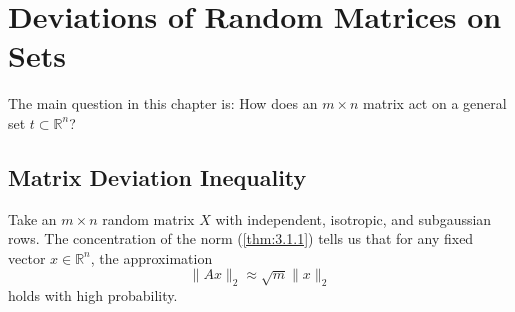 \section{Deviations of Random Matrices on Sets}
The main question in this chapter is: How does an $m \times n$ matrix act on a general set $t \subset 
\mathbb{R}^n$? 



\subsection{Matrix Deviation Inequality}
Take an $m \times n$ random matrix $X$ with independent, isotropic, and subgaussian rows. The concentration of 
the norm (\cref{thm:3.1.1}) tells us that for any fixed vector $x \in \mathbb{R}^n$, the approximation 
\[ \lVert Ax \rVert_{2} \approx \sqrt{m}\lVert x \rVert_{2} \]
holds with high probability.


